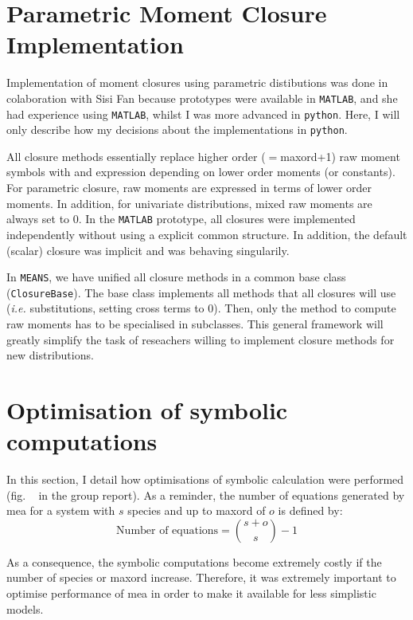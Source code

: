 \documentclass[11pt,a4paper]{article}
\newcommand{\means}{\texttt{MEANS}}
\newcommand{\py}{\texttt{python}}
\newcommand{\mat}{\texttt{MATLAB}}
\newcommand{\ie}{\emph{i.e.}}
\newcommand{\citationneeded}[2][]{\todo[color=brown, fancyline, #1]{\textbf{Citation Needed:} #2}}
\begin{document}
\section{Parametric Moment Closure Implementation}
Implementation of moment closures using parametric distibutions was done in colaboration 
with Sisi Fan because prototypes were available in \mat{}\cite{lakatos_preparation_2014}, and she had experience using \mat{}, 
whilst I was more advanced in \py{}. Here, I will only describe how my decisions about the implementations in \py{}.

All closure methods essentially replace higher order ($=$\gls{maxord}+1) raw moment symbols with and expression depending on lower order moments (or constants).
For parametric closure, raw moments are expressed in terms of lower order moments.
In addition, for univariate distributions, mixed raw moments are always set to $0$.
In the \mat{} prototype, all closures were implemented independently without using a explicit common structure.
In addition, the default (scalar) closure was implicit and was behaving singularily.

In \means, we have unified all closure methods in a common base class (\texttt{ClosureBase}).
The base class implements all methods that all closures will use (\ie{} substitutions, setting cross terms to $0$).
Then, only the method to compute raw moments has to be specialised in subclasses.
This general framework will greatly simplify the task of reseachers willing
to implement closure methods for new distributions.

\section{Optimisation of symbolic computations}

\label{sec:optimisation}

In this section, I detail how optimisations of symbolic calculation were performed (fig. ~\citationneeded{find me} in the group report).
As a reminder, the number of equations generated by \gls{mea} for a system with $s$ species and up to \gls{maxord} of $o$
is defined by:
\begin{equation}
    \text{Number of equations} = {{s + o} \choose {s}} - 1
    \label{eq:number_of_equations}
\end{equation}

As a consequence, the symbolic computations become extremely costly if the number of species or \gls{maxord} increase.
Therefore, it was extremely important to optimise performance of \gls{mea} in order to make it available for less simplistic models.
\end{document}
